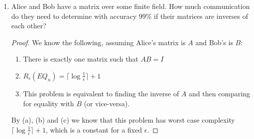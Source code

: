 \documentclass[usletter]{article}
\begin{document}
\begin{enumerate}
\begin{proof}
      By (a), (b) and (c) we know that $O(n^2)$ bits is sufficient to check the orthogonality of the subspaces because we can run the inner product protocol $n$ times, once for each vector in the basis for $A$ or $B$.

      Further, we can't do any better than the $n$ nondeterministic bits required for each inner product so if we were to reduce the required communication it would have to be by sending fewer vectors from our basis. Assume, that we can verify the orthogonality of $A$ and $B$ by sending fewer than $m$ vectors, this implies that there is some number of $m'$ that forms a basis for $A$ or $B$, but this contradicts our assumption that we were making use of the basis initially. So $O(n^2)$ is also necessary.
    \end{proof}

  \item Alice and Bob have a matrix over some finite field. How much communication do they need to determine with accuracy 99\% if their matrices are inverses of each other?

    \begin{proof}
      We know the following, assuming Alice's matrix is $A$ and Bob's is $B$:

      \begin{enumerate}
        \item There is exactly one matrix such that $AB = I$
        \item $R_{\epsilon}(EQ_n) = \lceil \log \frac{1}{\epsilon} \rceil + 1$
        \item This problem is equivalent to finding the inverse of $A$ and then comparing for equality with $B$ (or vice-versa).
      \end{enumerate}

      By (a), (b) and (c) we know that this problem has worst case complexity $\lceil \log \frac{1}{\epsilon} \rceil + 1$, which is a constant for a fixed $\epsilon$.
    \end{proof}
\end{enumerate}

\newpage



\end{document}
